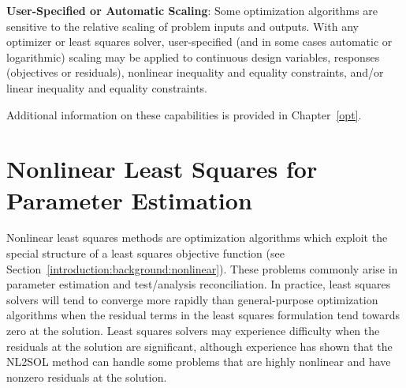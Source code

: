 
\textbf{User-Specified or Automatic Scaling}: Some optimization
algorithms are sensitive to the relative scaling of problem inputs and
outputs.  With any optimizer or least squares solver, user-specified
(and in some cases automatic or logarithmic) scaling may be applied to
continuous design variables, responses (objectives or residuals),
nonlinear inequality and equality constraints, and/or linear
inequality and equality constraints.

Additional information on these capabilities is provided in Chapter~\ref{opt}.

\section{Nonlinear Least Squares for Parameter Estimation}\label{capabilities:nonlinear}

Nonlinear least squares methods are optimization algorithms which
exploit the special structure of a least squares objective function
(see Section~\ref{introduction:background:nonlinear}). These problems
commonly arise in parameter estimation and test/analysis
reconciliation. In practice, least squares solvers will tend to
converge more rapidly than general-purpose optimization algorithms
when the residual terms in the least squares formulation tend towards
zero at the solution. Least squares solvers may experience difficulty
when the residuals at the solution are significant, although
experience has shown that the NL2SOL method can handle some problems
that are highly nonlinear and have nonzero residuals at the solution.

